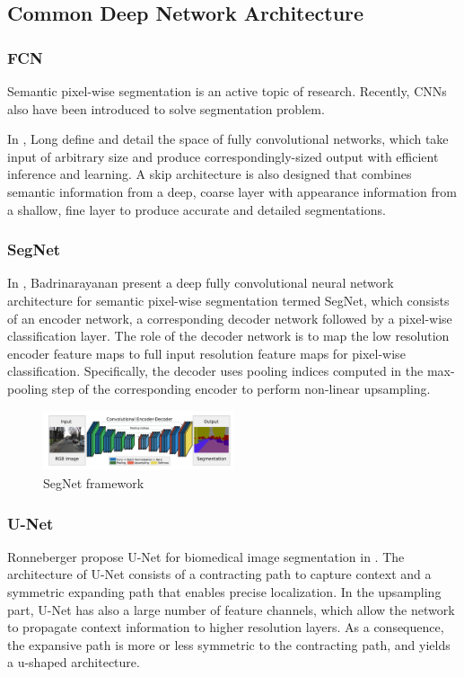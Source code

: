 \subsection{Common Deep Network Architecture}
\subsubsection{FCN}
Semantic pixel-wise segmentation is an active topic of research. Recently, CNNs also have been introduced to solve segmentation problem. 

In \cite{Long2015Fully}, Long \etal define and detail the space of fully convolutional networks, which take input of arbitrary size and produce correspondingly-sized output with efficient inference and learning. A skip architecture is also designed that combines semantic information from a deep, coarse layer with appearance information from a shallow, fine layer to produce accurate and detailed segmentations. 


\subsubsection{SegNet}
In \cite{SegNet}, Badrinarayanan \etal present a deep fully convolutional neural network architecture for semantic pixel-wise segmentation termed SegNet, which consists of an encoder network, a corresponding decoder network followed by a pixel-wise classification layer. The role of the decoder network is to map the low resolution encoder feature maps to full input resolution feature maps for pixel-wise classification. Specifically, the decoder uses pooling indices computed in the max-pooling step of the corresponding encoder to perform non-linear upsampling.

\begin{figure}[ht]
    \centering
    \includegraphics[width=0.5\textwidth]{./figure/SegNet.png}
    \caption{SegNet framework}
    \label{SegNet}
\end{figure}

\subsubsection{U-Net}
Ronneberger \etal propose U-Net for biomedical image segmentation in \cite{Ronneberger2015U}. The architecture of U-Net consists of a contracting path to capture context and a symmetric expanding path that enables precise localization. 
In the upsampling part, U-Net has also a large number of feature channels, which allow the network to propagate context information to higher resolution layers. As a consequence, the expansive path is more or less symmetric to the contracting path, and yields a u-shaped architecture.

